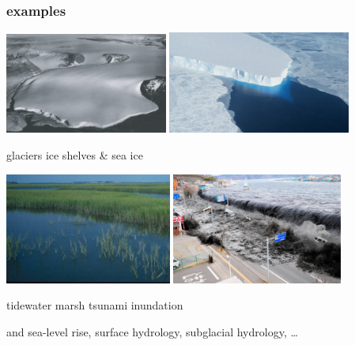 \documentclass[hide notes,intlimits]{beamer}
\begin{document}
\begin{frame}
  \frametitle{examples}
\includegraphics[width=0.4\textwidth,keepaspectratio=true]{polaris}
\hfill
\includegraphics[width=0.45\textwidth,keepaspectratio=true]{supp4rignot-small}

\small glaciers \hfill ice shelves \& sea ice
\medskip

\includegraphics[width=0.41\textwidth,keepaspectratio=true]{marsh-water}
\hfill
\includegraphics[width=0.42\textwidth,keepaspectratio=true]{tsunami-sendai}

\small tidewater marsh \hfill tsunami inundation

\scriptsize and sea-level rise, surface hydrology, subglacial hydrology, \dots
\end{frame}
\end{document}
